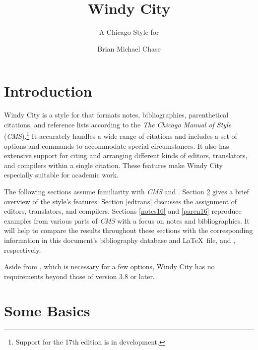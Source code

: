 \documentclass[11pt,letterpaper,oneside]{article}
\begin{document}
\title{Windy City}
\subtitle{A Chicago Style for \biblatex}
\author{Brian Michael Chase}
\maketitle
\tableofcontents{}
\newpage

\section{Introduction}
\label{intro}


Windy City is a style for \biblatex that formats notes,
bibliographies, parenthetical citations, and reference lists according
to the \textit{The Chicago Manual of Style}
(\textit{CMS}).\footnote{\cite{chicago2010} Support for the 17th
edition is in development.} It accurately handles a wide range of
citations and includes a set of options and commands to accommodate
special circumstances. It also has extensive support for citing and
arranging different kinds of editors, translators, and compilers
within a single citation. These features make Windy City especially
suitable for academic work.

The following sections assume familiarity with \textit{CMS} and
\biblatex. Section \ref{basics} gives a brief overview of the style's
features. Section \ref{edtrans} discusses the assignment of editors,
translators, and compilers. Sections \ref{notes16} and \ref{paren16}
reproduce examples from various parts of \textit{CMS} with a focus on
notes and bibliographies. It will help to compare the results
throughout these sections with the corresponding information in this
document's bibliography database and \LaTeX\ file,
 and , respectively.

Aside from \biber, which is necessary for a few options, Windy City
has no requirements beyond those of \biblatex version 3.8 or later.

\section{Some Basics}
\label{basics}
\end{document}
